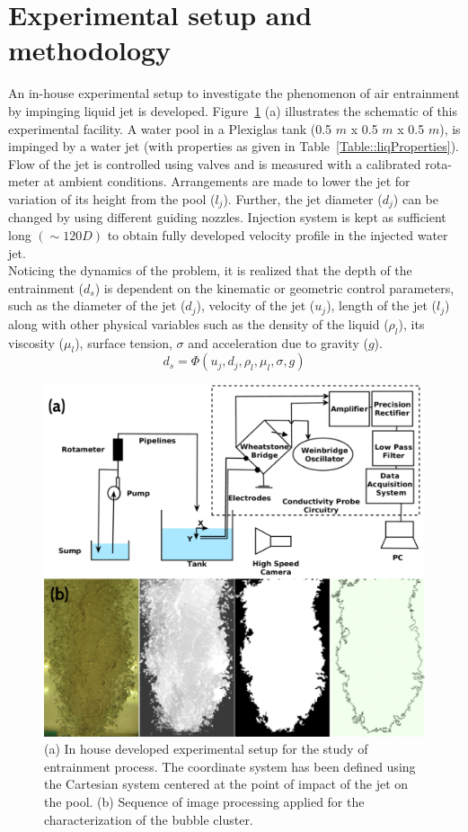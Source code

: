 \section{Experimental setup and methodology}
An in-house experimental setup to investigate the phenomenon of air entrainment by impinging liquid jet is developed. Figure~\ref{Fig::setup} (a) illustrates the schematic of this experimental facility. A water pool in a Plexiglas tank (0.5 $m$ x 0.5 $m$ x 0.5 $m$), is impinged by a water jet (with properties as given in Table~\ref{Table::liqProperties}). Flow of the jet is controlled using valves and is measured with a calibrated rota-meter at ambient conditions. Arrangements are made to lower the jet for variation of its height from the pool ($l_j$). Further, the jet diameter ($d_j$) can be changed by using different guiding nozzles. Injection system is kept as sufficient long $(\sim 120D)$ to obtain fully developed velocity profile in the injected water jet. \\
Noticing the dynamics of the problem, it is realized that the depth of the entrainment ($d_s$) is dependent on the kinematic or geometric control parameters, such as the diameter of the jet ($d_j$), velocity of the jet ($u_j$), length of the jet ($l_j$) along with other physical variables such as the density of the liquid ($\rho_l$), its viscosity ($\mu_l$), surface tension, $\sigma$ and acceleration due to gravity ($g$). 
\begin{equation}
d_s = \Phi(u_j, d_j, \rho_l, \mu_l, \sigma, g) 
\label{Equation::params}
\end{equation}
\begin{figure}
	\centering
	\includegraphics[width = 0.95\linewidth]{chapters/jetPool/Figure1}
	\caption{(a) In house developed experimental setup for the study of entrainment process. The coordinate system has been defined using the Cartesian system centered at the point of impact of the jet on the pool. (b) Sequence of image processing applied for the characterization of the bubble cluster.}
	\label{Fig::setup}
\end{figure}
